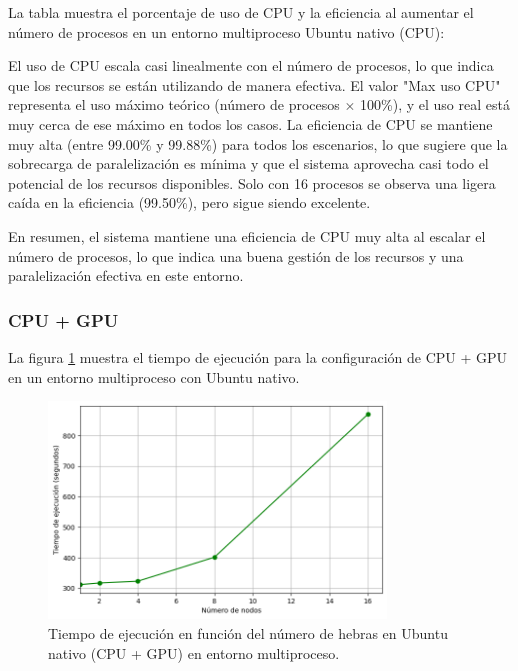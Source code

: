 La tabla muestra el porcentaje de uso de CPU y la eficiencia al aumentar el número de procesos en un entorno multiproceso Ubuntu nativo (CPU):

El uso de CPU escala casi linealmente con el número de procesos, lo que indica que los recursos se están utilizando de manera efectiva. El valor "Max uso CPU" representa el uso máximo teórico (número de procesos $\times$ 100\%), y el uso real está muy cerca de ese máximo en todos los casos. La eficiencia de CPU se mantiene muy alta (entre 99.00\% y 99.88\%) para todos los escenarios, lo que sugiere que la sobrecarga de paralelización es mínima y que el sistema aprovecha casi todo el potencial de los recursos disponibles. Solo con 16 procesos se observa una ligera caída en la eficiencia (99.50\%), pero sigue siendo excelente.

En resumen, el sistema mantiene una eficiencia de CPU muy alta al escalar el número de procesos, lo que indica una buena gestión de los recursos y una paralelización efectiva en este entorno.

\subsubsection{CPU + GPU}

La figura \ref{fig:multi-node_ubuntu_gpu_native_time} muestra el tiempo de ejecución para la configuración de CPU + GPU en un entorno multiproceso con Ubuntu nativo.

\begin{figure}[ht]
    \centering
    \includegraphics[width=0.8\textwidth]{imagenes/cap5/multi-node_ubuntu_gpu_native_time.png}
    \caption{Tiempo de ejecución en función del número de hebras en Ubuntu nativo (CPU + GPU) en entorno multiproceso.}
    \label{fig:multi-node_ubuntu_gpu_native_time}
\end{figure}

